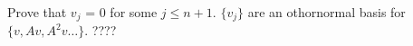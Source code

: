 \documentclass{article}
\begin{document}
 Prove that $v_j$ = 0 for some $j\le n+1$.
$\{v_j\}$ are an othornormal basis for $\{v, Av, A^2v \dots \}$. ????

\end{document}
